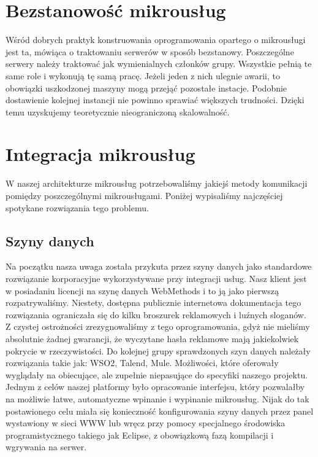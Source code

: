 \documentclass[licencjacka]{pracamgr}
\begin{document}
\section{Bezstanowość mikrousług}

Wśród dobrych praktyk konstruowania oprogramowania opartego o mikrousługi \cite{nginx}
jest ta, mówiąca o traktowaniu serwerów w sposób bezstanowy. Poszczególne serwery
należy traktować jak wymienialnych członków grupy. Wszystkie pełnią te same role i
wykonują tę samą pracę. Jeżeli jeden z nich ulegnie awarii, to obowiązki uszkodzonej
maszyny mogą przejąć pozostałe instacje. Podobnie dostawienie kolejnej instancji
nie powinno sprawiać większych trudności. Dzięki temu uzyskujemy teoretycznie
nieograniczoną skalowalność.

\section{Integracja mikrousług}
W naszej architekturze mikrousług potrzebowaliśmy jakiejś metody komunikacji
pomiędzy poszczególnymi mikrousługami. Poniżej wypisaliśmy najczęściej spotykane
rozwiązania tego problemu.

\subsection{Szyny danych}

Na początku nasza uwaga została przykuta przez szyny danych jako standardowe rozwiązanie korporacyjne wykorzystywane
przy integracji usług. Nasz klient jest w posiadaniu licencji na szynę danych WebMethods i to ją jako pierwszą
rozpatrywaliśmy. Niestety, dostępna publicznie internetowa dokumentacja tego rozwiązania ograniczała się do kilku
broszurek reklamowych i luźnych sloganów. Z czystej ostrożności zrezygnowaliśmy z tego oprogramowania, gdyż nie
mieliśmy absolutnie żadnej gwarancji, że wyczytane hasła reklamowe mają jakiekolwiek pokrycie w rzeczywistości.
Do kolejnej grupy sprawdzonych szyn danych należały rozwiązania takie jak: WSO2, Talend, Mule. Możliwości, które
oferowały wyglądały na obiecujące, ale zupełnie niepasujące do specyfiki naszego projektu. Jednym z celów naszej
platformy było opracowanie interfejsu, który pozwalałby na możliwie łatwe, automatyczne wpinanie i wypinanie
mikrousług. Nijak do tak postawionego celu miała się konieczność konfigurowania szyny danych przez panel wystawiony w sieci
WWW lub wręcz przy pomocy specjalnego środowiska programistycznego takiego jak Eclipse, z obowiązkową fazą kompilacji
i wgrywania na serwer. 
\end{document}
